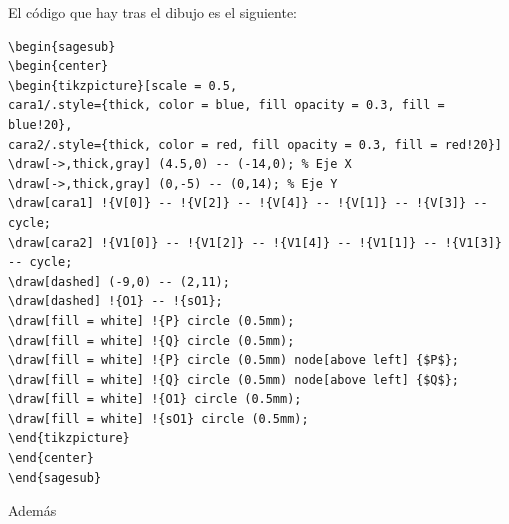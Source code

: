 \documentclass{amsart}
\begin{document}
El código que hay tras el dibujo es el siguiente:
\begin{verbatim}
\begin{sagesub}
\begin{center}
\begin{tikzpicture}[scale = 0.5,
cara1/.style={thick, color = blue, fill opacity = 0.3, fill = blue!20},
cara2/.style={thick, color = red, fill opacity = 0.3, fill = red!20}]
\draw[->,thick,gray] (4.5,0) -- (-14,0); % Eje X
\draw[->,thick,gray] (0,-5) -- (0,14); % Eje Y
\draw[cara1] !{V[0]} -- !{V[2]} -- !{V[4]} -- !{V[1]} -- !{V[3]} -- cycle;
\draw[cara2] !{V1[0]} -- !{V1[2]} -- !{V1[4]} -- !{V1[1]} -- !{V1[3]} -- cycle;
\draw[dashed] (-9,0) -- (2,11);
\draw[dashed] !{O1} -- !{sO1};
\draw[fill = white] !{P} circle (0.5mm);
\draw[fill = white] !{Q} circle (0.5mm);
\draw[fill = white] !{P} circle (0.5mm) node[above left] {$P$}; 
\draw[fill = white] !{Q} circle (0.5mm) node[above left] {$Q$};  
\draw[fill = white] !{O1} circle (0.5mm); 
\draw[fill = white] !{sO1} circle (0.5mm); 
\end{tikzpicture}
\end{center}
\end{sagesub}
\end{verbatim}
Además
\end{document}
